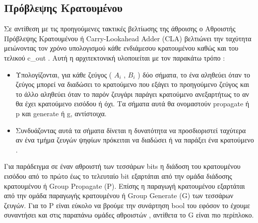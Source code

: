 \subsection{Πρόβλεψης Κρατουμένου}
Σε αντίθεση με τις προηγούμενες τακτικές βελτίωσης της άθροισης ο Αθροιστής Πρόβλεψης Κρατουμένου ή Carry-Lookahead Adder (CLA) βελτιώνει την ταχύτητα μειώνοντας τον χρόνο υπολογισμού κάθε ενδιάμεσου κρατουμένου καθώς και του τελικού c\_out .
Αυτή η αρχιτεκτονική υλοποιείται με τον παρακάτω τρόπο :
\begin{itemize}
    \item Υπολογίζονται, για κάθε ζεύγος ( $A_i$ , $B_i$ ) δύο σήματα, το ένα αληθεύει 
    όταν το ζεύγος μπορεί να διαδώσει το κρατούμενο που εξάγει το προηγούμενο ζεύγος 
    και το άλλο αληθεύει όταν το παρόν ζευγάρι παράγει κρατούμενο ανεξαρτήτως το 
    αν θα έχει κρατούμενο εισόδου ή όχι. Τα σήματα αυτά θα ονομαστούν propagate ή p
    και generate ή g, αντίστοιχα. 
    \item Συνδυάζοντας αυτά τα σήματα δίνεται η δυνατότητα να προσδιοριστεί ταχύτερα αν ένα τμήμα ζευγών ψηφίων πρόκειται να διαδώσει ή να παράξει ένα κρατούμενο .
\end{itemize}


Για παράδειγμα σε έναν αθροιστή των τεσσάρων bits η διάδοση του κρατουμένου εισόδου από το πρώτο έως το τελευταίο bit εξαρτάται από την ομάδα διάδοσης κρατουμένου ή Group Propagate (P). Επίσης η παραγωγή κρατουμένου εξαρτάται από την ομάδα παραγωγής κρατουμένου ή Group Generate (G) των τεσσάρων ζευγών. Για το P είναι εύκολο να βρούμε την συνάρτηση bool του εφόσον το έχουμε συναντήσει και στις παραπάνω ομάδες αθροιστών , αντίθετα το G είναι πιο περίπλοκο. 


